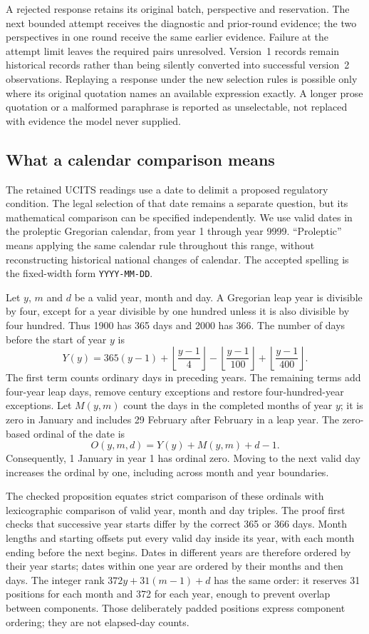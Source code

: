 A rejected response retains its original batch, perspective and reservation.
The next bounded attempt receives the diagnostic and prior-round evidence;
the two perspectives in one round receive the same earlier evidence. Failure
at the attempt limit leaves the required pairs unresolved. Version~1 records
remain historical records rather than being silently converted into successful
version~2 observations. Replaying a response under the new selection rules is
possible only where its original quotation names an available expression
exactly. A longer prose quotation or a malformed paraphrase is reported as
unselectable, not replaced with evidence the model never supplied.

\subsection{What a calendar comparison means}

The retained UCITS readings use a date to delimit a proposed regulatory
condition. The legal selection of that date remains a separate question,
but its mathematical comparison can be specified independently. We use valid
dates in the proleptic Gregorian calendar, from year 1 through year 9999.
``Proleptic'' means applying the same calendar rule throughout this range,
without reconstructing historical national changes of calendar. The accepted
spelling is the fixed-width form \texttt{YYYY-MM-DD}.

Let $y$, $m$ and $d$ be a valid year, month and day. A Gregorian leap year is
divisible by four, except for a year divisible by one hundred unless it is
also divisible by four hundred. Thus 1900 has 365 days and 2000 has 366.
The number of days before the start of year $y$ is
\[
 Y(y)=365(y-1)
       +\left\lfloor\frac{y-1}{4}\right\rfloor
       -\left\lfloor\frac{y-1}{100}\right\rfloor
       +\left\lfloor\frac{y-1}{400}\right\rfloor.
\]
The first term counts ordinary days in preceding years. The remaining terms
add four-year leap days, remove century exceptions and restore four-hundred-year
exceptions. Let $M(y,m)$ count the days in the completed months of year $y$;
it is zero in January and includes 29 February after February in a leap year.
The zero-based ordinal of the date is
\[
 O(y,m,d)=Y(y)+M(y,m)+d-1.
\]
Consequently, 1 January in year 1 has ordinal zero. Moving to the next valid
day increases the ordinal by one, including across month and year boundaries.

The checked proposition equates strict comparison of these ordinals with
lexicographic comparison of valid year, month and day triples. The proof first
checks that successive year starts differ by the correct 365 or 366 days.
Month lengths and starting offsets put every valid day inside its year, with
each month ending before the next begins. Dates in different years are
therefore ordered by their year starts; dates within one year are ordered by
their months and then days. The integer rank $372y+31(m-1)+d$ has the same
order: it reserves 31 positions for each month and 372 for each year, enough
to prevent overlap between components. Those deliberately padded positions
express component ordering; they are not elapsed-day counts.

